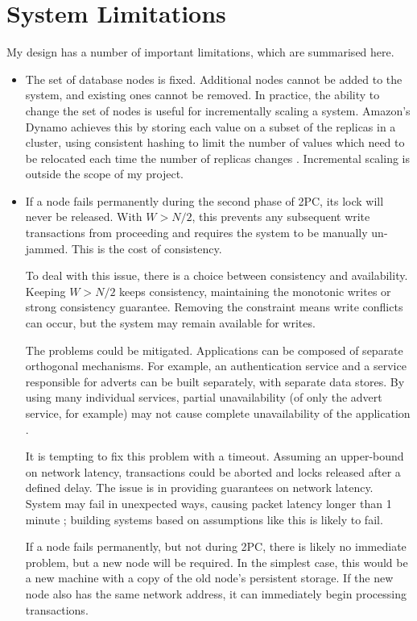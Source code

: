 \documentclass[12pt,a4paper,twoside,openany]{report}
\begin{document}
\section{System Limitations}

My design has a number of important limitations, which are summarised here.

\begin{itemize}
\item
The set of database nodes is fixed. Additional nodes cannot be added to the system, and existing ones cannot be removed. In practice, the ability to change the set of nodes is useful for incrementally scaling a system. Amazon's Dynamo achieves this by storing each value on a subset of the replicas in a cluster, using consistent hashing to limit the number of values which need to be relocated each time the number of replicas changes \cite{decandia2007dynamo}. Incremental scaling is outside the scope of my project.

\item
If a node fails permanently during the second phase of 2PC, its lock will never be released. With $W > N/2$, this prevents any subsequent write transactions from proceeding and requires the system to be manually un-jammed. This is the cost of consistency.

To deal with this issue, there is a choice between consistency and availability. Keeping $W > N/2$ keeps consistency, maintaining the monotonic writes or strong consistency guarantee. Removing the constraint means write conflicts can occur, but the system may remain available for writes.

The problems could be mitigated. Applications can be composed of separate orthogonal mechanisms. For example, an authentication service and a service responsible for adverts can be built separately, with separate data stores. By using many individual services, partial unavailability (of only the advert service, for example) may not cause complete unavailability of the application \cite{fox1999harvest}. %

It is tempting to fix this problem with a timeout. Assuming an upper-bound on network latency, transactions could be aborted and locks released after a defined delay. The issue is in providing guarantees on network latency. System may fail in unexpected ways, causing packet latency longer than 1 minute \cite{imbriaco_2012}; building systems based on assumptions like this is likely to fail.

If a node fails permanently, but not during 2PC, there is likely no immediate problem, but a new node will be required. In the simplest case, this would be a new machine with a copy of the old node's persistent storage. If the new node also has the same network address, it can immediately begin processing transactions.


\end{itemize}
\end{document}
